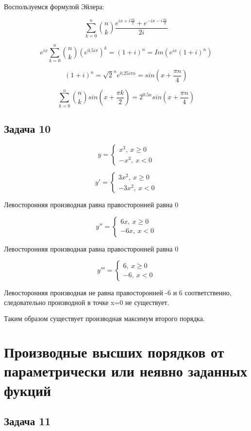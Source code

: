 \documentclass[a4paper,12pt]{article}
\begin{document}
Воспользуемся формулой Эйлера:

\[
\sum_{k=0}^{n} \binom{n}{k} \frac{e^{ix + i\frac{\pi k}{2}} + e^{-ix - i\frac{\pi k}{2}}}{2i}
\]

\[
e^{ix} \sum_{k=0}^{n} \binom{n}{k} (e^{0.5 i \pi})^k = (1+i)^n = Im(e^{ix}(1+i)^n)
\]

\[
(1+i)^n = \sqrt{2}^n e^{0.25i\pi n} = sin(x+\frac{\pi n}{4})
\]

\[
\sum_{k=0}^{n} \binom{n}{k} sin(x + \frac{\pi k}{2}) = 2^{0.5n} sin(x+\frac{\pi n}{4})
\]

\subsection{Задача 10}

\[
y = \begin{cases}
    x^3, \ x \ge 0 \\
    -x^3, \ x < 0 
\end{cases}
\]

\[
y' = \begin{cases}
    3x^2, \ x \ge 0 \\
    -3x^2, \ x < 0 
\end{cases}
\]

Левосторонняя производная равна правосторонней равна 0

\[
y'' = \begin{cases}
    6x, \ x \ge 0 \\
    -6x, \ x < 0 
\end{cases}
\]

Левосторонняя производная равна правосторонней равна 0

\[
y''' = \begin{cases}
    6, \ x \ge 0 \\
    -6, \ x < 0 
\end{cases}
\]

Левосторонняя производная не равна правосторонней -6 и 6 соответственно, следовательно производной в точке x=0 не существует.

Таким образом существует производная максимум второго порядка.

\section{Производные высших порядков от параметрически или неявно заданных фукций}

\subsection{Задача 11}
\end{document}
